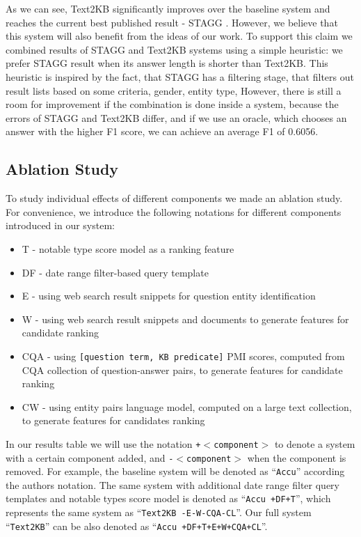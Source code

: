 As we can see, Text2KB significantly improves over the baseline system and reaches the current best published result - STAGG \cite{yih2015semantic}.
However, we believe that this system will also benefit from the ideas of our work.
To support this claim we combined results of STAGG and Text2KB systems using a simple heuristic: we prefer STAGG result when its answer length is shorter than Text2KB.
This heuristic is inspired by the fact, that STAGG has a filtering stage, that filters out result lists based on some criteria, \ie gender, entity type, \etc
However, there is still a room for improvement if the combination is done inside a system, because the errors of STAGG and Text2KB differ, and if we use an oracle, which chooses an answer with the higher F1 score, we can achieve an average F1 of 0.6056.


\subsection{Ablation Study}

To study individual effects of different components we made an ablation study.
For convenience, we introduce the following notations for different components introduced in our system:
\vspace{-0.1cm}
\begin{itemize}
\setlength\itemsep{-0.5em}
\item T - notable type score model as a ranking feature
\item DF - date range filter-based query template
\item E - using web search result snippets for question entity identification
\item W - using web search result snippets and documents to generate features for candidate ranking
\item CQA - using \texttt{[question term, KB predicate]} PMI scores, computed from CQA collection of question-answer pairs, to generate features for candidate ranking
\item CW - using entity pairs language model, computed on a large text collection, to generate features for candidates ranking
\end{itemize}

In our results table we will use the notation \texttt{+$<$component$>$} to denote a system with a certain component added, and \texttt{-$<$component$>$} when the component is removed.
For example, the baseline system will be denoted as ``\texttt{Accu}'' according the authors notation.
The same system with additional date range filter query templates and notable types score model is denoted as ``\texttt{Accu +DF+T}'', which represents the same system as ``\texttt{Text2KB -E-W-CQA-CL}''.
Our full system ``\texttt{Text2KB}'' can be also denoted as ``\texttt{Accu +DF+T+E+W+CQA+CL}''.

